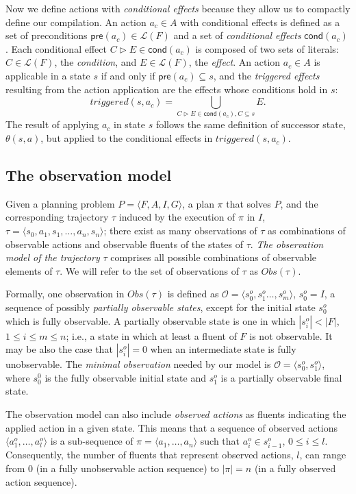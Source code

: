 \documentclass[runningheads]{llncs}
\newcommand{\tup}[1]{{\langle #1 \rangle}}
\newcommand{\pre}{\mathsf{pre}}     %
\newcommand{\cond}{\mathsf{cond}}   %
\begin{document}
Now we define actions with {\em conditional effects} because they allow us to compactly define our compilation. An action $a_c\in A$ with conditional effects is defined as a set of preconditions $\pre(a_c)\in\mathcal{L}(F)$ and a set of {\em conditional effects} $\cond(a_c)$. Each conditional effect $C\rhd E\in\cond(a_c)$ is composed of two sets of literals: $C\in\mathcal{L}(F)$, the {\em condition}, and $E\in\mathcal{L}(F)$, the {\em effect}. An action $a_c\in A$ is applicable in a state $s$ if and only if $\pre(a_c)\subseteq s$, and the {\em triggered effects} resulting from the action application are the effects whose conditions hold in $s$:
\[
triggered(s,a_c)=\bigcup\limits_{C\rhd E\in\cond(a_c),C\subseteq s} E.
\]
The result of applying $a_c$ in state $s$ follows the same definition of successor state, $\theta(s,a)$, but applied to the conditional effects in $triggered(s,a_c)$.


\subsection{The observation model}

Given a planning problem $P=\tup{F,A,I,G}$, a plan $\pi$ that solves $P$, and the corresponding trajectory $\tau$ induced by the execution of $\pi$ in $I$, $\tau=\tup{s_0, a_1, s_1, \ldots, a_n, s_n}$; there exist as many observations of $\tau$ as combinations of observable actions and observable fluents of the states of $\tau$. \emph{The observation model of the trajectory} $\tau$ comprises all possible combinations of observable elements of $\tau$. We will refer to the set of observations of $\tau$ as $Obs(\tau)$.

Formally, one observation in $Obs(\tau)$ is defined as $\mathcal{O}=\tup{s_0^o,s_1^o \ldots , s_m^o}$, $s_0^o=I$,  a sequence of possibly {\em partially observable states}, except for the initial state $s_0^o$ which is fully observable. A partially observable state is one in which $|s_i^o| < |F|$, {\small $1\leq i\leq m\leq n$}; i.e., a state in which at least a fluent of $F$ is not observable. It may be also the case that $|s_i^o| = 0$ when an intermediate state is fully unobservable. The \emph{minimal observation} needed by our model is $\mathcal{O}=\tup{s_0^o,s_1^o}$, where $s_0^0$ is the fully observable initial state and $s_1^o$ is a partially observable final state.

The observation model can also include {\em observed actions} as fluents indicating the applied action in a given state. This means that a sequence of observed actions $\tup{a_1^o, \ldots, a_l^o}$ is a sub-sequence of $\pi=\tup{a_1, \ldots, a_n}$ such that $a_i^o \in s_{i-1}^o$, {\small $0\leq i \leq l$}. Consequently, the number of fluents that represent observed actions, $l$, can range from $0$ (in a fully unobservable action sequence) to $|\pi|=n$ (in a fully observed action sequence).
\end{document}
